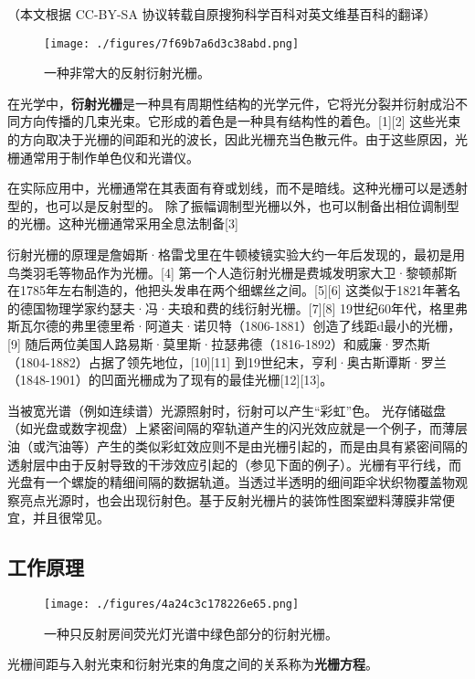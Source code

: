 
（本文根据 CC-BY-SA 协议转载自原搜狗科学百科对英文维基百科的翻译）

\begin{figure}[ht]
\centering
\texttt{[image: ./figures/7f69b7a6d3c38abd.png]}
\caption{一种非常大的反射衍射光栅。} \label{fig_YSGS_8}
\end{figure}

在光学中，\textbf{衍射光栅}是一种具有周期性结构的光学元件，它将光分裂并衍射成沿不同方向传播的几束光束。它形成的着色是一种具有结构性的着色。[1][2] 这些光束的方向取决于光栅的间距和光的波长，因此光栅充当色散元件。由于这些原因，光栅通常用于制作单色仪和光谱仪。

在实际应用中，光栅通常在其表面有脊或划线，而不是暗线。这种光栅可以是透射型的，也可以是反射型的。 除了振幅调制型光栅以外，也可以制备出相位调制型的光栅。这种光栅通常采用全息法制备[3]

衍射光栅的原理是詹姆斯·格雷戈里在牛顿棱镜实验大约一年后发现的，最初是用鸟类羽毛等物品作为光栅。[4] 第一个人造衍射光栅是费城发明家大卫·黎顿郝斯在1785年左右制造的，他把头发串在两个细螺丝之间。[5][6] 这类似于1821年著名的德国物理学家约瑟夫·冯·夫琅和费的线衍射光栅。[7][8] 19世纪60年代，格里弗斯瓦尔德的弗里德里希·阿道夫·诺贝特（1806-1881）创造了线距d最小的光栅，[9] 随后两位美国人路易斯·莫里斯·拉瑟弗德（1816-1892）和威廉·罗杰斯（1804-1882）占据了领先地位，[10][11] 到19世纪末，亨利·奥古斯谭斯·罗兰（1848-1901）的凹面光栅成为了现有的最佳光栅[12][13]。

当被宽光谱（例如连续谱）光源照射时，衍射可以产生“彩虹”色。 光存储磁盘（如光盘或数字视盘）上紧密间隔的窄轨道产生的闪光效应就是一个例子，而薄层油（或汽油等）产生的类似彩虹效应则不是由光栅引起的，而是由具有紧密间隔的透射层中由于反射导致的干涉效应引起的（参见下面的例子）。光栅有平行线，而光盘有一个螺旋的精细间隔的数据轨道。当透过半透明的细间距伞状织物覆盖物观察亮点光源时，也会出现衍射色。基于反射光栅片的装饰性图案塑料薄膜非常便宜，并且很常见。

\subsection{工作原理}
\begin{figure}[ht]
\centering
\texttt{[image: ./figures/4a24c3c178226e65.png]}
\caption{一种只反射房间荧光灯光谱中绿色部分的衍射光栅。} \label{fig_YSGS_1}
\end{figure}

光栅间距与入射光束和衍射光束的角度之间的关系称为\textbf{光栅方程}。

